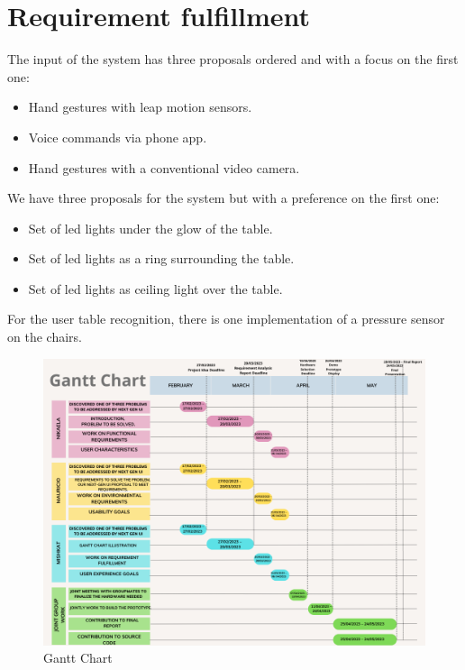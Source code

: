 \documentclass{article}
\begin{document}
\section{Requirement fulfillment}
The input of the system has three proposals ordered and with a focus on the first one:
\begin{itemize}
    \item Hand gestures with leap motion sensors.
    \item Voice commands via phone app.
    \item Hand gestures with a conventional video camera.
\end{itemize}
We have three proposals for the system but with a preference on the first one:
\begin{itemize}
    \item Set of led lights under the glow of the table.
    \item Set of led lights as a ring surrounding the table.
    \item Set of led lights as ceiling light over the table.
\end{itemize}
For the user table recognition, there is one implementation of a pressure sensor on the chairs.


\begin{figure}[!htb]
\centering
\includegraphics[width=\linewidth]{GanttChart.png}
\caption{Gantt Chart}
\label{Query results for 6th - 10th execution}
\end{figure}



\end{document}
